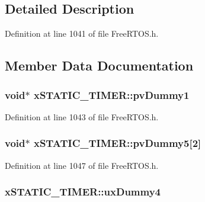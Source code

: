 \subsection{Detailed Description}


Definition at line 1041 of file Free\+R\+T\+O\+S.\+h.



\subsection{Member Data Documentation}
\subsubsection[{\texorpdfstring{pv\+Dummy1}{pvDummy1}}]{\setlength{\rightskip}{0pt plus 5cm}void$\ast$ x\+S\+T\+A\+T\+I\+C\+\_\+\+T\+I\+M\+E\+R\+::pv\+Dummy1}\hypertarget{structx_s_t_a_t_i_c___t_i_m_e_r_a040499298faced6032f84f3a33c785fd}{}\label{structx_s_t_a_t_i_c___t_i_m_e_r_a040499298faced6032f84f3a33c785fd}


Definition at line 1043 of file Free\+R\+T\+O\+S.\+h.

\subsubsection[{\texorpdfstring{pv\+Dummy5}{pvDummy5}}]{\setlength{\rightskip}{0pt plus 5cm}void$\ast$ x\+S\+T\+A\+T\+I\+C\+\_\+\+T\+I\+M\+E\+R\+::pv\+Dummy5\mbox{[}2\mbox{]}}\hypertarget{structx_s_t_a_t_i_c___t_i_m_e_r_a9410b4450349079b65e2c25605913cbf}{}\label{structx_s_t_a_t_i_c___t_i_m_e_r_a9410b4450349079b65e2c25605913cbf}


Definition at line 1047 of file Free\+R\+T\+O\+S.\+h.

\subsubsection[{\texorpdfstring{ux\+Dummy4}{uxDummy4}}]{ x\+S\+T\+A\+T\+I\+C\+\_\+\+T\+I\+M\+E\+R\+::ux\+Dummy4}\hypertarget{structx_s_t_a_t_i_c___t_i_m_e_r_abe61bde25ac09934004caa0222f4831b}{}\label{structx_s_t_a_t_i_c___t_i_m_e_r_abe61bde25ac09934004caa0222f4831b}


